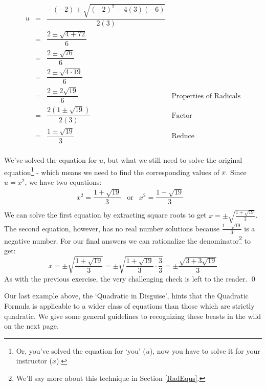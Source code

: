 \documentclass[10pt]{article}
\begin{document}
\begin{ex}
\begin{enumerate}
\[\begin{array}{rclr}
u & = & \dfrac{-(-2) \pm \sqrt{(-2)^2 - 4(3)(-6)}}{2(3)} & \\ [10pt]

& = & \dfrac{2 \pm \sqrt{4 + 72}}{6} & \\ [10pt]

& = & \dfrac{2 \pm \sqrt{76}}{6} & \\ [10pt]

& = & \dfrac{2 \pm \sqrt{4 \cdot 19}}{6} & \\ [10pt]

& = & \dfrac{2 \pm 2\sqrt{19}}{6} & \text{Properties of Radicals} \\ [10pt]

& = & \dfrac{2(1 \pm \sqrt{19})}{2(3)} & \text{Factor} \\ [10pt]

& = & \dfrac{1 \pm \sqrt{19}}{3} & \text{Reduce} \\

\end{array} \]

We've solved the equation for $u$, but what we still need to solve the original equation\footnote{Or, you've solved the equation for `you' ($u$), now you have to solve it for your instructor ($x$).} - which means we need to find the corresponding values of $x$.  Since $u = x^2$, we have two equations:\[ \begin{array}{rclr}  

x^2  =\dfrac{1 + \sqrt{19}}{3} & \text{or} & x^2  =\dfrac{1 - \sqrt{19}}{3} & \\

\end{array}\] We can solve the first equation by extracting square roots to get  $x = \pm \sqrt{\frac{1 + \sqrt{19}}{3}}$.  The second equation, however, has no real number solutions because $\frac{1 - \sqrt{19}}{3}$ is a negative number.  For our final answers we can rationalize the denominator\footnote{We'll say more about this technique in Section \ref{RadEqus}.} to get: \[ x = \pm \sqrt{\dfrac{1 + \sqrt{19}}{3}} = \pm \sqrt{\dfrac{1 + \sqrt{19}}{3} \cdot \dfrac{3}{3}} = \pm \dfrac{\sqrt{3 + 3\sqrt{19}}}{3} \] As with the previous exercise, the very challenging check is left to the reader. \qed

\end{enumerate}

\end{ex}

Our last example above, the `Quadratic in Disguise', hints that the Quadratic Formula is applicable to a wider class of equations than those which are strictly quadratic.  We give some general guidelines to recognizing these beasts in the wild on the next page.
\end{document}
